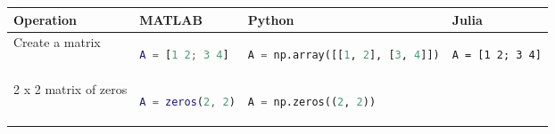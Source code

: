 \documentclass[10pt, landscape]{article}
\begin{document}
\begin{multicols}{2}
\begin{tabular}[]{@{}llll@{}}
\toprule
\begin{minipage}[b]{0.24\columnwidth}\raggedright\strut
Operation\strut
\end{minipage} & \begin{minipage}[b]{0.20\columnwidth}\raggedright\strut
MATLAB\strut
\end{minipage} & \begin{minipage}[b]{0.25\columnwidth}\raggedright\strut
Python\strut
\end{minipage} & \begin{minipage}[b]{0.20\columnwidth}\raggedright\strut
Julia\strut
\end{minipage}\tabularnewline
\midrule
\begin{minipage}[t]{0.24\columnwidth}\raggedright\strut
Create a matrix\strut
\end{minipage} & \begin{minipage}[t]{0.20\columnwidth}\raggedright\strut
\begin{lstlisting}[language=Matlab]
A = [1 2; 3 4]
\end{lstlisting}
\strut
\end{minipage} & \begin{minipage}[t]{0.25\columnwidth}\raggedright\strut
\begin{lstlisting}[language=Python]
A = np.array([[1, 2], [3, 4]])
\end{lstlisting}
\strut
\end{minipage} & \begin{minipage}[t]{0.20\columnwidth}\raggedright\strut
\begin{lstlisting}
A = [1 2; 3 4]
\end{lstlisting}
\strut
\end{minipage}\tabularnewline
\begin{minipage}[t]{0.24\columnwidth}\raggedright\strut
2 x 2 matrix of zeros\strut
\end{minipage} & \begin{minipage}[t]{0.20\columnwidth}\raggedright\strut
\begin{lstlisting}[language=Matlab]
A = zeros(2, 2)
\end{lstlisting}
\strut
\end{minipage} & \begin{minipage}[t]{0.25\columnwidth}\raggedright\strut
\begin{lstlisting}[language=Python]
A = np.zeros((2, 2))
\end{lstlisting}

\end{minipage}
\end{tabular}
\end{multicols}
\end{document}
